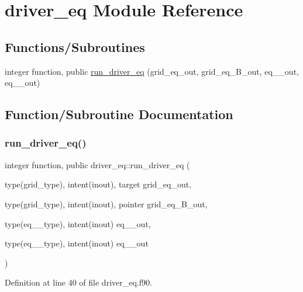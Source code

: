 \hypertarget{namespacedriver__eq}{}\section{driver\+\_\+eq Module Reference}
\label{namespacedriver__eq}
\subsection*{Functions/\+Subroutines}
\begin{DoxyCompactItemize}
\item 
integer function, public \hyperlink{namespacedriver__eq_ac8eca434f541966edc3556d72f261eff}{run\+\_\+driver\+\_\+eq} (grid\+\_\+eq\+\_\+out, grid\+\_\+eq\+\_\+\+B\+\_\+out, eq\+\_\+\_\+out, eq\+\_\+\_\+out)
\end{DoxyCompactItemize}


\subsection{Function/\+Subroutine Documentation}
\mbox{\label{namespacedriver__eq_ac8eca434f541966edc3556d72f261eff}} 
\subsubsection{\texorpdfstring{run\+\_\+driver\+\_\+eq()}{run\_driver\_eq()}}
{\footnotesize\ttfamily integer function, public driver\+\_\+eq\+::run\+\_\+driver\+\_\+eq (\begin{DoxyParamCaption}\item[{type(grid\+\_\+type), intent(inout), target}]{grid\+\_\+eq\+\_\+out,  }\item[{type(grid\+\_\+type), intent(inout), pointer}]{grid\+\_\+eq\+\_\+\+B\+\_\+out,  }\item[{type(eq\+\_\+1\+\_\+type), intent(inout)}]{eq\+\_\+\_\+out,  }\item[{type(eq\+\_\+2\+\_\+type), intent(inout)}]{eq\+\_\+\_\+out }\end{DoxyParamCaption})}



Definition at line 40 of file driver\+\_\+eq.\+f90.

